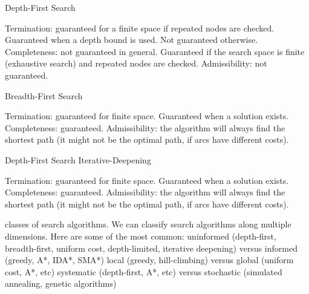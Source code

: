 \documentclass[../main.tex]{subfiles}
\begin{document}
    Depth-First Search 	

    Termination:
        guaranteed for a finite space if repeated nodes are checked. Guaranteed when a depth bound is used. Not guaranteed otherwise. 
    Completeness:
        not guaranteed in general. Guaranteed if the search space is finite (exhaustive search) and repeated nodes are checked. 
    Admissibility:
        not guaranteed. 

    Breadth-First Search 	

    Termination:
        guaranteed for finite space. Guaranteed when a solution exists. 
    Completeness:
        guaranteed. 
    Admissibility:
        the algorithm will always find the shortest path (it might not be the optimal path, if arcs have different costs). 

    Depth-First Search Iterative-Deepening 	

    Termination:
        guaranteed for finite space. Guaranteed when a solution exists. 
    Completeness:
        guaranteed. 
    Admissibility:
        the algorithm will always find the shortest path (it might not be the optimal path, if arcs have different costs). 

    classes of search algorithms. We can classify search algorithms along multiple dimensions. Here are some of the most common:
        uninformed (depth-first, breadth-first, uniform cost, depth-limited, iterative deepening) versus informed (greedy, A*, IDA*, SMA*)
        local (greedy, hill-climbing) versus global (uniform cost, A*, etc)
        systematic (depth-first, A*, etc) versus stochastic (simulated annealing, genetic algorithms) 
\end{document}
